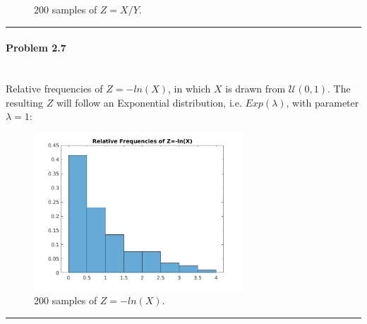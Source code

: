 \documentclass[12pt, letterpaper]{scrartcl}
\begin{document}
\begin{enumerate}[((a))]
        \begin{figure}[h!]
            \centering
            \caption{200 samples of $Z=X/Y$.}
        \end{figure}
        \clearpage
    \end{enumerate}
\hrule
\paragraph*{Problem 2.7} \hfill\\
    Relative frequencies of $Z=-ln(X)$, in which $X$ is drawn from $\mathcal{U}(0,1)$. The resulting $Z$ will follow an Exponential distribution, i.e. $Exp(\lambda)$, with parameter $\lambda=1$:
    \begin{figure}[h!]
        \centering
        \includegraphics[width=0.7\textwidth]{hw2_figures/2.7.png}
        \caption{200 samples of $Z=-ln(X)$.}
    \end{figure}
    \clearpage
\hrule
\end{document}
